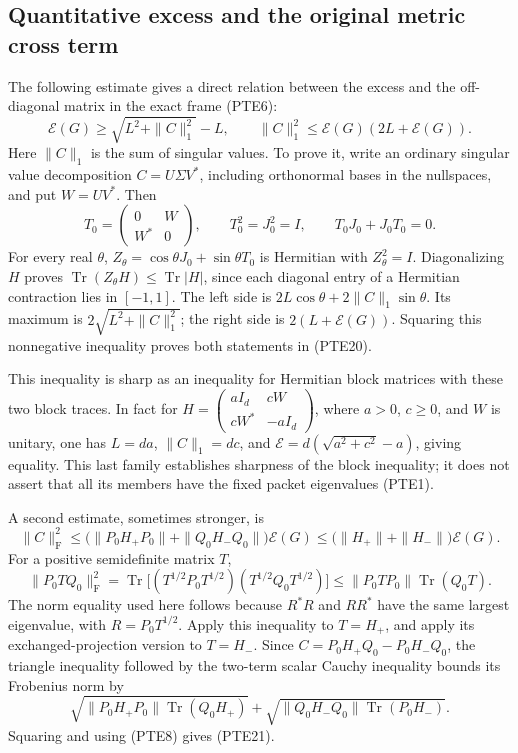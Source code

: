 \subsection{Quantitative excess and the original metric cross term}

The following estimate gives a direct relation between the excess and
the off-diagonal matrix in the exact frame (PTE6):
\begin{equation}\tag{PTE20}\label{eq:pte20}
 \mathcal E(G)\geq\sqrt{L^2+\|C\|_1^2}-L,
 \qquad
 \|C\|_1^2\leq\mathcal E(G)(2L+\mathcal E(G)).
\end{equation}
Here \(\|C\|_1\) is the sum of singular values.  To prove it, write an
ordinary singular value decomposition \(C=U\Sigma V^*\), including
orthonormal bases in the nullspaces, and put \(W=UV^*\).  Then
\[
 T_0=\begin{pmatrix}0&W\\W^*&0\end{pmatrix},
 \qquad T_0^2=J_0^2=I,
 \qquad T_0J_0+J_0T_0=0.
\]
For every real \(\theta\),
\(Z_\theta=\cos\theta J_0+\sin\theta T_0\) is Hermitian with
\(Z_\theta^2=I\).  Diagonalizing \(H\) proves
\(\operatorname{Tr}(Z_\theta H)\leq\operatorname{Tr}|H|\), since
each diagonal entry of a Hermitian contraction lies in \([-1,1]\).
The left side is
\(2L\cos\theta+2\|C\|_1\sin\theta\).  Its maximum is
\(2\sqrt{L^2+\|C\|_1^2}\); the right side is
\(2(L+\mathcal E(G))\).  Squaring this nonnegative inequality proves
both statements in (PTE20).

This inequality is sharp as an inequality for Hermitian block matrices
with these two block traces.  In fact for
\(H=\left(\begin{smallmatrix}aI_d&cW\\cW^*&-aI_d\end{smallmatrix}\right)\),
where \(a>0\), \(c\geq0\), and \(W\) is unitary, one has
\(L=da\), \(\|C\|_1=dc\), and
\(\mathcal E=d(\sqrt{a^2+c^2}-a)\), giving equality.  This last family
establishes sharpness of the block inequality; it does not assert
that all its members have the fixed packet eigenvalues (PTE1).

A second estimate, sometimes stronger, is
\begin{equation}\tag{PTE21}\label{eq:pte21}
 \|C\|_{\mathrm F}^2
 \leq\bigl(\|P_0H_+P_0\|+\|Q_0H_-Q_0\|\bigr)\mathcal E(G)
 \leq\bigl(\|H_+\|+\|H_-\|\bigr)\mathcal E(G).
\end{equation}
For a positive semidefinite matrix \(T\),
\[
 \|P_0TQ_0\|_{\mathrm F}^2
 =\operatorname{Tr}\bigl[(T^{1/2}P_0T^{1/2})
                         (T^{1/2}Q_0T^{1/2})\bigr]
 \leq\|P_0TP_0\|\operatorname{Tr}(Q_0T).
\]
The norm equality used here follows because \(R^*R\) and \(RR^*\)
have the same largest eigenvalue, with \(R=P_0T^{1/2}\).
Apply this inequality to \(T=H_+\), and apply its exchanged-projection
version to \(T=H_-\).  Since
\(C=P_0H_+Q_0-P_0H_-Q_0\), the triangle inequality followed by the
two-term scalar Cauchy inequality bounds its Frobenius norm by
\[
 \sqrt{\|P_0H_+P_0\|\operatorname{Tr}(Q_0H_+)}
 +\sqrt{\|Q_0H_-Q_0\|\operatorname{Tr}(P_0H_-)}.
\]
Squaring and using (PTE8) gives (PTE21).

